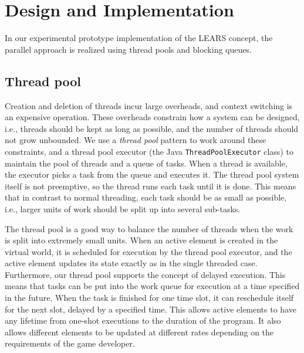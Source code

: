 \section{Design and Implementation}\label{sec:implementation}


In our experimental prototype implementation of the LEARS concept, the
parallel approach is realized using thread pools and blocking queues.

\subsection{Thread pool}

Creation and deletion of threads incur large overheads,
and context switching is an expensive operation.  These overheads
constrain how a system can be designed, i.e., threads should be kept
as long as possible, and the number of threads should not grow
unbounded. We use a \textit{thread pool} pattern to work around these
constraints, and a thread pool executor (the Java
\texttt{ThreadPoolExecutor} class) to maintain the pool
of threads and a queue of tasks. When a thread is available, the
executor picks a task from the queue and executes it. The thread
pool system itself is not preemptive, so the thread runs each task
until it is done. This means that in contrast to normal threading,
each task should be as small as possible, i.e., larger units of work should
be split up into several sub-tasks.

The thread pool is a good way to balance the number of threads
when the work is split into extremely small units. When an active
element is created in the virtual world, it is scheduled for
execution by the thread pool executor, and the active element updates
its state exactly as in the single threaded case.
%
Furthermore, our thread pool supports the concept of delayed
execution. This means that tasks can be put into the work queue for
execution at a time specified in the future.
%
When the task is finished for one time slot, it can reschedule itself
for the next slot, delayed by a specified time. This allows active
elements to have any lifetime from one-shot executions to the duration
of the program. It also allows different elements to be updated at
different rates depending on the requirements of the game developer.

